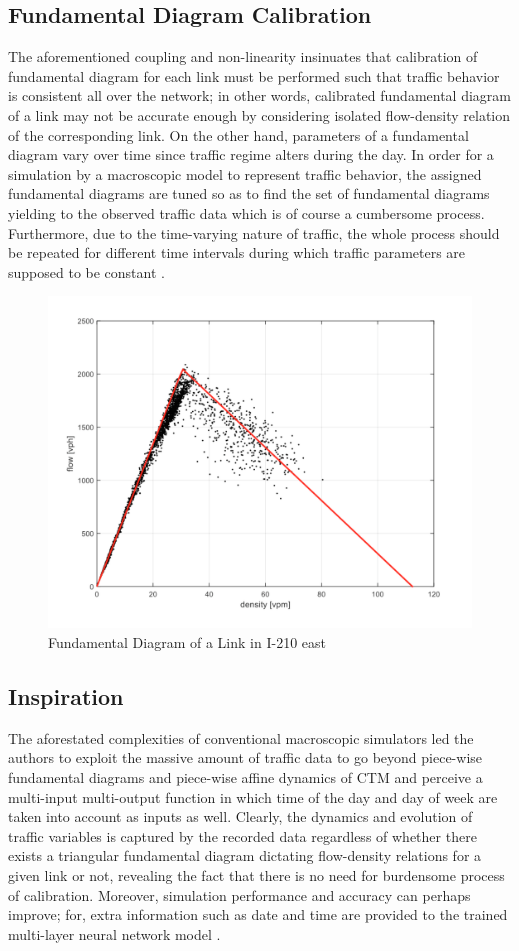 \documentclass[twocolumn,10pt]{asme2e}
\begin{document}
\subsection{Fundamental Diagram Calibration}
The aforementioned coupling and non-linearity insinuates that calibration of fundamental diagram for each link must be performed such that traffic behavior is consistent all over the network; in other words, calibrated fundamental diagram of a link may not be accurate enough by considering isolated flow-density relation of the corresponding link. On the other hand, parameters of a fundamental diagram vary over time since traffic regime alters during the day. In order for a simulation by a macroscopic model to represent traffic behavior, the assigned fundamental diagrams are tuned so as to find the set of fundamental diagrams yielding to the observed traffic data which is of course a cumbersome process. Furthermore, due to the time-varying nature of traffic, the whole process should be repeated for different time intervals during which traffic parameters are supposed to be constant \cite{Calibration}. 

\begin{figure}[h]
    \centering
    \includegraphics[width=0.8\linewidth]{fd.png}
    \caption{Fundamental Diagram of a Link in I-210 east}
    \label{fig:fd}
\end{figure} 
\subsection{Inspiration}
The aforestated complexities of conventional macroscopic simulators led the authors to exploit the massive amount of traffic data to go beyond piece-wise fundamental diagrams and piece-wise affine dynamics of CTM and perceive a multi-input multi-output function in which time of the day and day of week are taken into account as inputs as well. Clearly, the dynamics and evolution of traffic variables is captured by the recorded data regardless of whether there exists a triangular fundamental diagram dictating flow-density relations for a given link or not, revealing the fact that there is no need for burdensome process of calibration. Moreover, simulation performance and accuracy can perhaps improve; for, extra information such as date and time are provided to the trained multi-layer neural network model \cite{neuralForcast}.  
\end{document}
